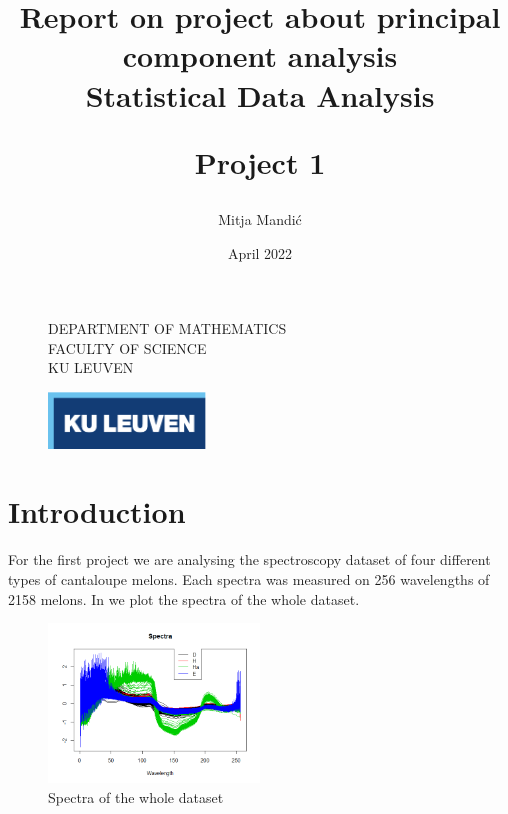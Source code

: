 \documentclass[12pt]{article}
\title{\vspace*{40.0mm}
  \bf Report on project about principal component analysis
         \vspace*{20.0mm} \\
  \Large\bf Statistical Data Analysis 
  
 
  
  Project 1 \vspace*{20.0mm}
  \vspace*{40.0mm}}
\author{Mitja Mandić}
\date{ April 2022}
\makeatletter
\def\cleardoublepage{\clearpage\if@twoside \ifodd\c@page\else%
\hbox{}%
\thispagestyle{empty}%
\clearpage%
\if@twocolumn\hbox{}\clearpage\fi\fi\fi}
\makeatother
\begin{document}
\begin{figure}
  \parbox[t]{125mm}{
    \vspace*{6mm}
    \scriptsize\sf           DEPARTMENT OF MATHEMATICS \\
    \scriptsize\sf           FACULTY OF SCIENCE\\
    \scriptsize\sf           KU LEUVEN}
  \parbox[t]{40mm}{
    \begin{flushright}
      \includegraphics[height=15mm]{../images/logo.eps.pdf}
    \end{flushright}}
\end{figure}

\maketitle
\thispagestyle{empty}
\raggedbottom

\cleardoublepage
{}
\setcounter{tocdepth}{2}
{}

\section{Introduction}
For the first project we are analysing the spectroscopy dataset of four different types of cantaloupe melons. Each spectra was measured on 256 wavelengths of 2158 melons.
In \label{fig:spectra} we plot the spectra of the whole dataset.
\begin{figure}[h]
    \begin{center}
        \centering
        \includegraphics[width=0.5\textwidth]{../images/spectra.png}
    \end{center}
    \caption{Spectra of the whole dataset}
    \label{fig:spectra}
\end{figure}
\end{document}
